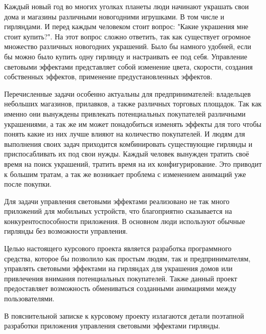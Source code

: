 \label{sec:introduction}

Каждый новый год во многих уголках планеты люди начинают украшать свои дома и магазины различными новогодними игрушками. В том числе и гирляндами. И перед каждым человеком стоит вопрос: "Какие украшения мне стоит купить?". На этот вопрос сложно ответить, так как существует огромное множество различных новогодних украшений. Было бы намного удобней, если бы можно было купить одну гирлянду и настраивать ее под себя. Управление световыми эффектами представляет собой изменение цвета, скорости, создания собственных эффектов, применение предустановленных эффектов.

Перечисленные задачи особенно актуальны для предпринимателей: владельцев небольших магазинов, прилавков, а также различных торговых площадок. Так как именно они вынуждены привлекать потенциальных покупателей различными украшениями, а так же им может понадобиться изменять эффекты для того чтобы понять какие из них лучше влияют на количество покупателей. И людям для выполнения своих задач приходится комбинировать существующие гирлянды и приспосабливать их под свои нужды. Каждый человек вынужден тратить своё время на поиск украшений, тратить время на их конфигурирование. Это приводит к большим тратам, а так же возникает проблема с изменением анимаций уже после покупки.

Для задачи управления световыми эффектами реализовано не так много приложений для мобильных устройств, что благоприятно сказывается на конкурентоспособности приложения. В основном люди используют обычные гирлянды без возможности управления.

Целью настоящего курсового проекта является разработка программного средства, которое бы позволило как простым людям, так и предпринимателям, управлять световыми эффектами на гирляндах для украшения домов или привлечения внимания потенциальных покупателей. Также данный проект предоставляет возможность обмениваться созданными анимациями между пользователями. 

В пояснительной записке к курсовому проекту излагаются детали поэтапной разработки приложения управления световыми эффектами гирлянды.